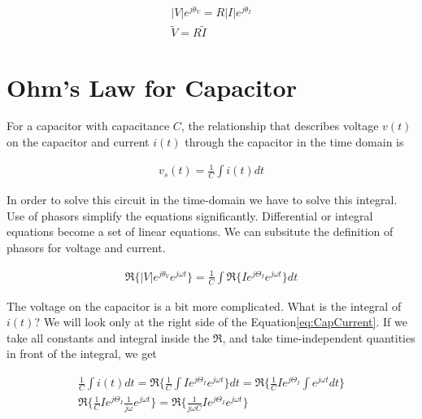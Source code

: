 \documentclass{ximera}
\begin{document}
\begin{eqnarray}
|V|e^{j\theta_{V}}    =  R |I|e^{j\theta_{I}}  \\
\tilde{V} = R \tilde{I}
\end{eqnarray}




\section{Ohm's Law for Capacitor}

 

For a  capacitor with capacitance $C$, the relationship that describes voltage $v(t)$ on the capacitor and  current $i(t)$ through the capacitor in the time domain is



\begin{eqnarray}
v_s(t) =  \frac{1}{C} \int i(t) dt \label{eq:capTD}
\end{eqnarray} 


In order to solve this circuit in the time-domain we have to  solve this integral.
Use of phasors simplify the equations
significantly. Differential or integral equations become a set of
linear equations. We can subsitute the definition of phasors for voltage and current.




\begin{eqnarray}
 \Re\{|V|e^{j\theta_{V}} e^{j \omega t}\} =  \frac{1}{C} \int \Re\{I e^{j \Theta_I} e^{j \omega t}\}  dt \label{eq:CapCurrent}
\end{eqnarray} 


The voltage on the capacitor is a bit more complicated. What is the integral of $i(t)$? We will look only at the right side of the Equation\ref{eq:CapCurrent}. If we take all constants and integral inside the $\Re$,  and   take  time-independent quantities in front of the integral, we get




\begin{eqnarray}
 \frac{1}{C} \int i(t) dt  =  \Re\{   \frac{1}{C} \int I e^{j \Theta_I} e^{j \omega t}\}  dt  = \Re\{   \frac{1}{C}  I e^{j \Theta_I} \int e^{j \omega t}dt \}    \\
 \Re\{   \frac{1}{C}  I e^{j \Theta_I} \frac{1}{j \omega} e^{j \omega t}  \}   = \Re\{   \frac{1}{j \omega C}  I e^{j \Theta_I}  e^{j \omega t}  \}  
\end{eqnarray} 
\end{document}
